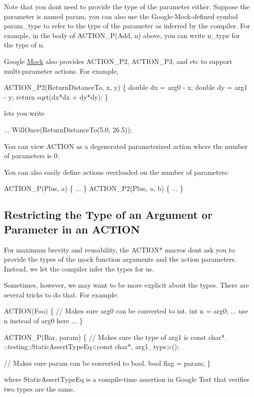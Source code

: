Note that you don\textquotesingle{}t need to provide the type of the parameter either. Suppose the parameter is named {\ttfamily param}, you can also use the Google-\/\+Mock-\/defined symbol {\ttfamily param\+\_\+type} to refer to the type of the parameter as inferred by the compiler. For example, in the body of {\ttfamily A\+C\+T\+I\+O\+N\+\_\+\+P(\+Add, n)} above, you can write {\ttfamily n\+\_\+type} for the type of {\ttfamily n}.

Google \hyperlink{classMock}{Mock} also provides {\ttfamily A\+C\+T\+I\+O\+N\+\_\+\+P2}, {\ttfamily A\+C\+T\+I\+O\+N\+\_\+\+P3}, and etc to support multi-\/parameter actions. For example, 
\begin{DoxyCode}
ACTION\_P2(ReturnDistanceTo, x, y) \{
  \textcolor{keywordtype}{double} dx = arg0 - x;
  \textcolor{keywordtype}{double} dy = arg1 - y;
  \textcolor{keywordflow}{return} sqrt(dx*dx + dy*dy);
\}
\end{DoxyCode}
 lets you write 
\begin{DoxyCode}
... WillOnce(ReturnDistanceTo(5.0, 26.5));
\end{DoxyCode}


You can view {\ttfamily A\+C\+T\+I\+ON} as a degenerated parameterized action where the number of parameters is 0.

You can also easily define actions overloaded on the number of parameters\+: 
\begin{DoxyCode}
ACTION\_P(Plus, a) \{ ... \}
ACTION\_P2(Plus, a, b) \{ ... \}
\end{DoxyCode}


\subsection*{Restricting the Type of an Argument or Parameter in an A\+C\+T\+I\+ON}

For maximum brevity and reusability, the {\ttfamily A\+C\+T\+I\+O\+N$\ast$} macros don\textquotesingle{}t ask you to provide the types of the mock function arguments and the action parameters. Instead, we let the compiler infer the types for us.

Sometimes, however, we may want to be more explicit about the types. There are several tricks to do that. For example\+: 
\begin{DoxyCode}
ACTION(Foo) \{
  \textcolor{comment}{// Makes sure arg0 can be converted to int.}
  \textcolor{keywordtype}{int} n = arg0;
  ... use n instead of arg0 here ...
\}

ACTION\_P(Bar, param) \{
  \textcolor{comment}{// Makes sure the type of arg1 is const char*.}
  ::testing::StaticAssertTypeEq<const char*, arg1\_type>();

  \textcolor{comment}{// Makes sure param can be converted to bool.}
  \textcolor{keywordtype}{bool} flag = param;
\}
\end{DoxyCode}
 where {\ttfamily Static\+Assert\+Type\+Eq} is a compile-\/time assertion in Google Test that verifies two types are the same.

